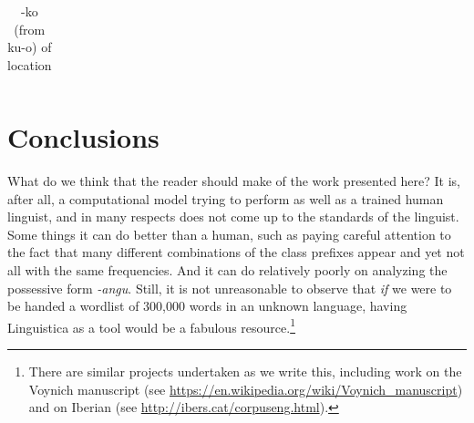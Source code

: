 \documentclass[output=paper,colorlinks,citecolor=brown]{langscibook}
\begin{document}
\begin{table}
\begin{center}
\begin{tabular}{lllllllllllllllllll}
 
 
\\
 \end{tabular}
\caption{-ko (from ku-o) of location}
\label{ko}
\end{center}
\end{table}




\section{Conclusions}

What do we think that the reader should make of the work presented here? It is, after all, a computational model trying to perform as well as a trained human linguist, and in many respects does not come up to the standards of the linguist. Some things it can do better than a human, such as paying careful attention to the fact that many different combinations of the class prefixes appear and yet not all with the same frequencies. And it can do relatively poorly on analyzing the possessive form \textit{-angu}. Still, it is not unreasonable to observe that \textit{if} we were to be handed a wordlist of 300,000 words in an unknown language, having Linguistica as a tool would be a fabulous resource.\footnote{There are similar projects undertaken as we write this, including work on the Voynich manuscript (see \url{https://en.wikipedia.org/wiki/Voynich\_manuscript}) and on Iberian (see \url{http://ibers.cat/corpuseng.html}).} 
\end{document}
